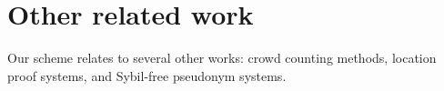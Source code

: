 \section{Other related work}%
\label{related-work}

Our scheme relates to several other works: crowd counting methods, location 
proof systems, and Sybil-free pseudonym systems.





